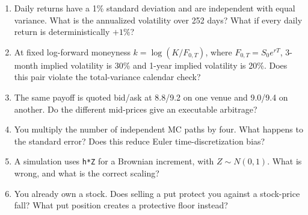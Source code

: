 \documentclass[10pt,letterpaper]{article}
\newenvironment{drill}[1]{\begin{enumerate}[label=\textbf{#1.\arabic*},
 leftmargin=2.7em,labelsep=0.6em,itemsep=4pt,topsep=4pt,parsep=0pt]}{\end{enumerate}}
\begin{document}
\begin{drill}{6}
\item Daily returns have a 1\% standard deviation and are independent with equal variance.
What is the annualized volatility over 252 days? What if every daily return is deterministically $+1\%$?
\item At fixed log-forward moneyness $k=\log(K/F_{0,T})$, where $F_{0,T}=S_0e^{rT}$,
3-month implied volatility is 30\% and 1-year implied volatility is 20\%.
Does this pair violate the total-variance calendar check?
\item The same payoff is quoted bid/ask at 8.8/9.2 on one venue and 9.0/9.4 on another.
Do the different mid-prices give an executable arbitrage?
\item You multiply the number of independent MC paths by four. What happens to the standard error?
Does this reduce Euler time-discretization bias?
\item A simulation uses \texttt{h*Z} for a Brownian increment, with $Z\sim N(0,1)$.
What is wrong, and what is the correct scaling?
\item You already own a stock. Does selling a put protect you against a stock-price fall?
What put position creates a protective floor instead?
\end{drill}
\end{document}
